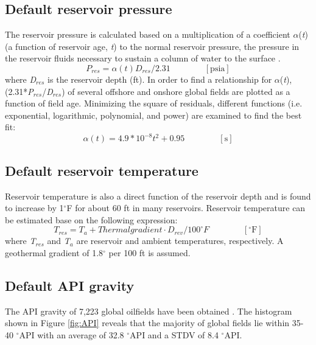 \documentclass[11pt]{report}
\newcommand{\eqnunit}[1]{\quad\quad \scriptstyle{\left[\text{#1}\right]}}
\begin{document}
\subsection{Default reservoir pressure}
The reservoir pressure is calculated based on a multiplication of a coefficient $\alpha$(\emph{t}) (a function of reservoir age, \emph{t}) to the normal reservoir pressure, the pressure in the reservoir fluids necessary to sustain a column of water to the surface \cite{fertl1981abnormal}. 
\begin{equation} \label{eq:res_pressure1}
P_{res}= \alpha(t)D_{res}/2.31 \quad\quad\eqnunit{psia}
\end{equation}
where \emph{D$_{res}$} is the reservoir depth (ft). In order to find a relationship for $\alpha$(\emph{t}), (2.31*\emph{P$_{res}$}/\emph{D$_{res}$}) of several offshore and onshore global fields are plotted as a function of field age. Minimizing the square of residuals, different functions (i.e. exponential, logarithmic, polynomial, and power) are examined to find the best fit: 
\begin{equation}\label{eq:res_pressure2}
\alpha(t)=4.9*10^{-8}t{^2}+0.95 \quad\quad\eqnunit{s}
\end{equation}

\subsection{Default reservoir temperature}
Reservoir temperature is also a direct function of the reservoir depth and is found to increase by 1$^{\circ}$F for about 60 ft in many reservoirs. Reservoir temperature can be estimated base on the following expression:
\begin{equation}\label{eq:res_temp}
T_{res}=T_{a}+Thermal gradient\cdot D_{rev}/100^{\circ}F \quad\quad\eqnunit{$^{\circ}$F}
\end{equation}
where \emph{T$_{res}$} and \emph{T$_{a}$} are reservoir and ambient temperatures, respectively. A geothermal gradient of 1.8$^{\circ}$ per 100 ft is assumed. 

\subsection{Default API gravity}

The API gravity of 7,223 global oilfields have been obtained \cite{masnadi2018global}. The histogram shown in Figure \ref{fig:API} reveals that the majority of global fields lie within 35-40 $^\circ$API with an average of 32.8 $^\circ$API and a STDV of 8.4 $^\circ$API.  
\end{document}
